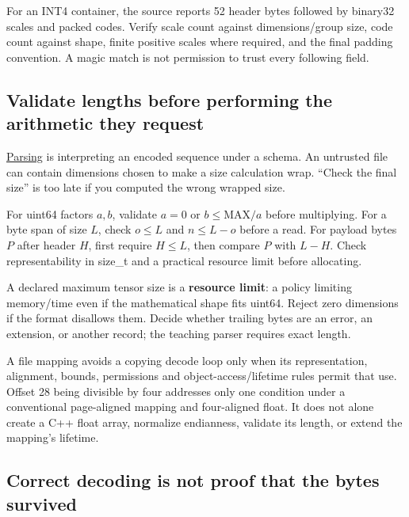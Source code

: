 For an INT4 container, the source reports 52 header bytes followed by binary32 scales and packed codes. Verify scale count against dimensions/group size, code count against shape, finite positive scales where required, and the final padding convention. A magic match is not permission to trust every following field.

\subsection{Validate lengths before performing the arithmetic they request}\label{01-foundations-i-ch002-validate-lengths-before-performing-the-arithmetic-they-request}

\hypertarget{01-foundations-i-ch002-validate-lengths-before-performing-the-arithmetic-they-request}{}

\hyperref[appendix-652d81568de9]{Parsing} is interpreting an encoded sequence under a schema. An untrusted file can contain dimensions chosen to make a size calculation wrap. ``Check the final size'' is too late if you computed the wrong wrapped size.

For uint64 factors \(a,b\), validate \(a=0\) or \(b\le\mathrm{MAX}/a\) before multiplying. For a byte span of size \(L\), check \(o\le L\) and \(n\le L-o\) before a read. For payload bytes \(P\) after header \(H\), first require \(H\le L\), then compare \(P\) with \(L-H\). Check representability in size\_t and a practical resource limit before allocating.

A declared maximum tensor size is a \textbf{resource limit}: a policy limiting memory/time even if the mathematical shape fits uint64. Reject zero dimensions if the format disallows them. Decide whether trailing bytes are an error, an extension, or another record; the teaching parser requires exact length.

A file mapping avoids a copying decode loop only when its representation, alignment, bounds, permissions and object-access/lifetime rules permit that use. Offset 28 being divisible by four addresses only one condition under a conventional page-aligned mapping and four-aligned float. It does not alone create a C++ float array, normalize endianness, validate its length, or extend the mapping's lifetime.

\subsection{Correct decoding is not proof that the bytes survived}\label{01-foundations-i-ch002-correct-decoding-is-not-proof-that-the-bytes-survived}


